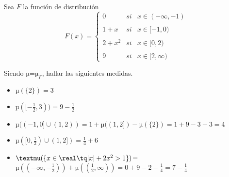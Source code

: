 \begin{problem}
Sea $F$ la función de distribución
\[F(x)=\left\{ \begin{array}{lcc}
             0 &   si  & x \in (-\infty, -1) \\
             \\ 1+x & si & x \in [-1, 0) \\
             \\ 2+x^2 & si & x \in [0, 2) \\
             \\ 9 &  si  & x \in [2, \infty)
             \end{array}
   \right.\]

Siendo µ=$µ_F$, hallar las siguientes medidas.
\solution
\begin{itemize}
\item $µ(\{2\}) = 3 $
\item $µ([-\frac{1}{2}, 3)) = 9 - \frac{1}{2}$
\item $µ((-1,0]\cup (1,2)) = 1 + µ((1,2]) - µ(\{2\}) = 1 + 9 -3 - 3 = 4$
\item $µ([0, \frac{1}{2}) \cup (1, 2]) = \frac{1}{4} + 6$
\item $µ(\{x \in \real \tq |x|+2x^2 > 1\})$=$µ((-\infty, -\frac{1}{2})) + µ((\frac{1}{2}, \infty)) = 0 + 9 - 2 - \frac{1}{4} = 7 - \frac{1}{4}$
\end{itemize}
\end{problem}

